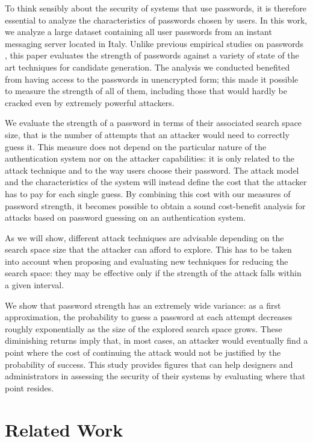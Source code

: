 \documentclass[a4paper,twocolumn]{article}
\begin{document}
To think sensibly about the security of systems that use passwords,
it is therefore essential to analyze the characteristics of passwords
chosen by users. In this work, we analyze a large dataset containing
all user passwords from an instant messaging server located in Italy.
Unlike previous empirical studies on passwords \cite{Morris1979Password,Klein1990Foiling,Spafford1992Observing,Narayanan2005Fast,Cazier2006Password,Florencio2007Largescale,Marechal2008Advances},
this paper evaluates the strength of passwords against a variety of
state of the art techniques for candidate generation. The analysis
we conducted benefited from having access to the passwords in unencrypted
form; this made it possible to measure the strength of all of them,
including those that would hardly be cracked even by extremely powerful
attackers.

We evaluate the strength of a password in terms of their associated
search space size, that is the number of attempts that an attacker
would need to correctly guess it. This measure does not depend on
the particular nature of the authentication system nor on the attacker
capabilities: it is only related to the attack technique and to the
way users choose their password. The attack model and the characteristics
of the system will instead define the cost that the attacker has to
pay for each single guess. By combining this cost with our measures
of password strength, it becomes possible to obtain a sound cost-benefit
analysis for attacks based on password guessing on an authentication
system.

As we will show, different attack techniques are advisable depending
on the search space size that the attacker can afford to explore.
This has to be taken into account when proposing and evaluating new
techniques for reducing the search space: they may be effective only
if the strength of the attack falls within a given interval.

We show that password strength has an extremely wide variance: as
a first approximation, the probability to guess a password at each
attempt decreases roughly exponentially as the size of the explored
search space grows. These diminishing returns imply that, in most
cases, an attacker would eventually find a point where the cost of
continuing the attack would not be justified by the probability of
success. This study provides figures that can help designers and administrators
in assessing the security of their systems by evaluating where that
point resides.


\section{Related Work}
\end{document}
